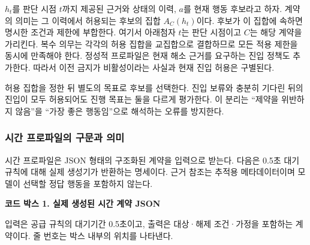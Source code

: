\documentclass[10pt,a4paper,twocolumn]{article}\usepackage[margin=18mm]{geometry}\usepackage{fontspec,kotex}
\begin{document}
$h_t$를 판단 시점 $t$까지 제공된 근거와 상태의 이력, $a$를 현재 행동 후보라고 하자. 계약의 의미는 그 이력에서 허용되는 후보의 집합 $A_C(h_t)$이다. 후보가 이 집합에 속하면 명시한 조건과 제한에 부합한다. 여기서 아래첨자 $t$는 판단 시점이고 $C$는 해당 계약을 가리킨다. 복수 의무는 각각의 허용 집합을 교집합으로 결합하므로 모든 적용 제한을 동시에 만족해야 한다. 정성적 프로파일은 현재 해소 근거를 요구하는 진입 정책도 추가한다. 따라서 이전 금지가 비활성이라는 사실과 현재 진입 허용은 구별된다.\par

허용 집합을 정한 뒤 별도의 목표로 후보를 선택한다. 진입 보류와 충분히 기다린 뒤의 진입이 모두 허용되어도 진행 목표는 둘을 다르게 평가한다. 이 분리는 “제약을 위반하지 않음”을 “가장 좋은 행동임”으로 해석하는 오류를 방지한다.\par

\subsubsection{시간 프로파일의 구문과 의미}

시간 프로파일은 JSON 형태의 구조화된 계약을 입력으로 받는다. 다음은 0.5초 대기 규칙에 대해 실제 생성기가 반환하는 명세이다. 근거 참조는 추적용 메타데이터이며 모델이 선택할 정답 행동을 포함하지 않는다.\par

\textbf{코드 박스 1. 실제 생성된 시간 계약 JSON}\par

입력은 공급 규칙의 대기기간 0.5초이고, 출력은 대상·해제 조건·가정을 포함하는 계약이다. 줄 번호는 박스 내부의 위치를 나타낸다.\par
\end{document}
